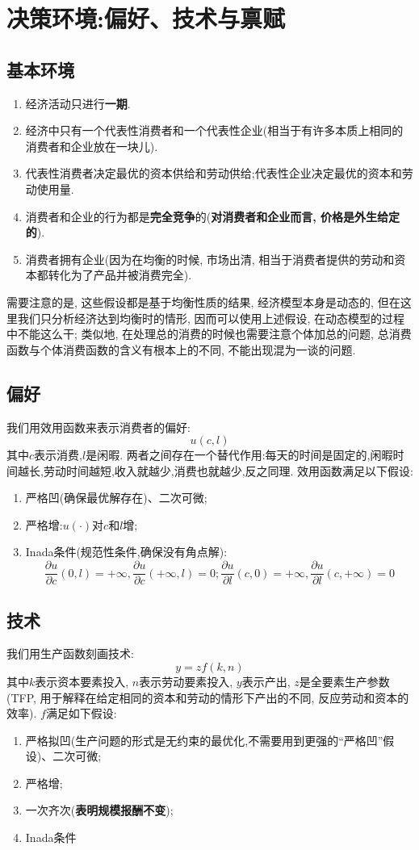 \documentclass[lang=cn,10pt]{elegantbook}
\begin{document}
\section{决策环境:偏好、技术与禀赋}
\subsection{基本环境}
\begin{enumerate}
    \item 经济活动只进行\textbf{一期}.
    \item 经济中只有一个代表性消费者和一个代表性企业(相当于有许多本质上相同的消费者和企业放在一块儿).
    \item 代表性消费者决定最优的资本供给和劳动供给;代表性企业决定最优的资本和劳动使用量.
    \item 消费者和企业的行为都是\textbf{完全竞争}的(\textbf{对消费者和企业而言, 价格是外生给定的}).
    \item 消费者拥有企业(因为在均衡的时候, 市场出清, 相当于消费者提供的劳动和资本都转化为了产品并被消费完全).
\end{enumerate}
需要注意的是, 这些假设都是基于均衡性质的结果, 经济模型本身是动态的, 但在这里我们只分析经济达到均衡时的情形, 因而可以使用上述假设, 在动态模型的过程中不能这么干;
类似地, 在处理总的消费的时候也需要注意个体加总的问题, 总消费函数与个体消费函数的含义有根本上的不同, 不能出现混为一谈的问题.
\subsection{偏好}
我们用效用函数来表示消费者的偏好:
$$u(c,l)$$
其中$c$表示消费,$l$是闲暇. 两者之间存在一个替代作用:每天的时间是固定的,闲暇时间越长,劳动时间越短,收入就越少,消费也就越少,反之同理.
效用函数满足以下假设:
\begin{enumerate}
   \item 严格凹(确保最优解存在)、二次可微;
   \item 严格增:$u(\cdot)$对$c$和$l$增;
   \item Inada条件(规范性条件,确保没有角点解):$$\frac{\partial u}{\partial c}(0,l)=+\infty,\frac{\partial u}{\partial c}(+\infty,l)=0;\frac{\partial u}{\partial l}(c,0)=+\infty,\frac{\partial u}{\partial l}(c,+\infty)=0$$
\end{enumerate}
\subsection{技术}
我们用生产函数刻画技术:
$$y=zf(k,n)$$
其中$k$表示资本要素投入, $n$表示劳动要素投入, $y$表示产出, $z$是全要素生产参数(TFP, 用于解释在给定相同的资本和劳动的情形下产出的不同, 反应劳动和资本的效率).
$f$满足如下假设:
\begin{enumerate}
    \item 严格拟凹(生产问题的形式是无约束的最优化,不需要用到更强的“严格凹”假设)、二次可微;
    \item 严格增;
    \item 一次齐次(\textbf{表明规模报酬不变});
    \item Inada条件
\end{enumerate}
\end{document}

